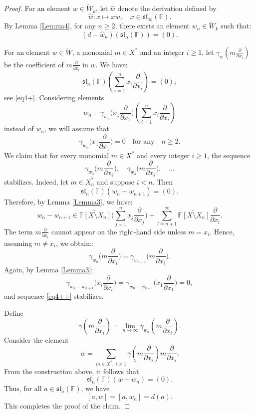 \documentclass[12pt,a4paper]{amsart}
\theoremstyle{plain}
\begin{document}
	
	\begin{proof} For an element $w \in \widetilde{W}_k$, let $\hat{w}$ denote the derivation defined by $$\hat{w}: x \mapsto xw, \quad  x \in \mathfrak{sl}_\infty(\mathbb{F}).$$ By Lemma \ref{Lemma4}, for any $n \geq 2$, there exists an element $w_n \in \widetilde{W}_k$ such that:
		\[
		(d - \hat{w}_n)(\mathfrak{sl}_n(\mathbb{F})) = (0).
		\]
		
		For an element $w \in \widetilde{W}$, a monomial $m\in X^{*}$ and   an integer $i\geq 1$, let $\gamma_w(m \frac{\partial}{\partial x_i})$ be the coefficient of $m \frac{\partial}{\partial x_i}$ in $w$. We have:
		\[
		\mathfrak{sl}_n(\mathbb{F})\left( \sum_{i=1}^{n} x_i \frac{\partial}{\partial x_i} \right) = (0);
		\] see \eqref{eq4+}.
		Considering elements $$w_n - \gamma_{w_n} \Big(x_1 \frac{\partial}{\partial x_1}\Big) \left( \sum_{i=1}^{n} x_i \frac{\partial}{\partial x_i} \right)$$ instead of $w_n$, we will assume that $$\gamma_{w_{n}}\Big(x_1 \frac{\partial}{\partial x_1}\Big) = 0 \quad \text{for any} \quad n \geq 2.$$
		We claim that for every monomial $m \in X^*$ and every integer $i\geq 1$, the sequence \begin{equation}\label{eq4++} \gamma_{w_2}\Big(m \frac{\partial}{\partial x_i}\Big), \quad \gamma_{w_3}\Big(m \frac{\partial}{\partial x_{i}}\Big), \quad \dots \end{equation} stabilizes. Indeed, let $m \in X^*_n$ and suppose $i<n$. Then $$\mathfrak{sl}_n(\mathbb{F}) \left( w_n - w_{n+1} \right) = (0).$$ Therefore, by Lemma \ref{Lemma3}, we have:
		\[
		w_n - w_{n+1} \in \widetilde{\mathbb{F}[X \setminus X_n]} \Big(\sum_{j=1}^{n} x_j \frac{\partial}{\partial x_j} \Big)+ \sum_{l=n+1}^{\infty} \widetilde{\mathbb{F}[X \setminus X_n]} \frac{\partial}{\partial x_l}.
		\]
		The term $m \frac{\partial}{\partial x_i}$ cannot appear on the right-hand side unless $m = x_i$. Hence, assuming $m \neq x_i$, we obtain::
		\[
		\gamma_{w_n}\Big(m \frac{\partial}{\partial x_i}\Big) = \gamma_{w_{n+1}}\Big(m \frac{\partial}{\partial x_i}\Big).
		\]
		Again, by Lemma \ref{Lemma3}:
		\[
		\gamma_{w_n -w_{n+1}}\Big(x_i \frac{\partial}{\partial x_i}\Big) = \gamma_{w_n -w_{n+1}}\Big(x_1 \frac{\partial}{\partial x_1}\Big)= 0,
		\]
		and sequence \eqref{eq4++} stabilizes.
		
		Define
		\[
		\gamma\left(m \frac{\partial}{\partial x_i}\right) = \lim_{n \to \infty} 
		\gamma_{w_n}\left(m \frac{\partial}{\partial x_i}\right).
		\]
		Consider the element
		\[
		w = \sum_{m \in X^*,\ i \geq 1} \gamma\left(m \frac{\partial}{\partial x_i}\right) 
		m \frac{\partial}{\partial x_i}.
		\]
		From the construction above, it follows that
		\[
		\mathfrak{sl}_n(\mathbb{F})(w - w_n) =( 0).
		\]
		Thus, for all \( a \in \mathfrak{sl}_n(\mathbb{F}) \), we have
		\[
		[a, w] = [a, w_n] = d(a).
		\] This completes the proof of the claim. \end{proof}
	
\end{document}
